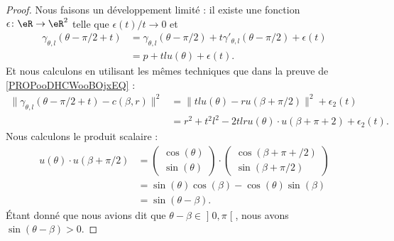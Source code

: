 \begin{proof}
	Nous faisons un développement limité : il existe une fonction \(\epsilon \colon \eR\to \eR^2  \) telle que \( \epsilon(t)/t\to 0\) et
	\begin{subequations}
		\begin{align}
			\gamma_{\theta,l}(\theta-\pi/2+t) & =\gamma_{\theta,l}(\theta-\pi/2)+t\gamma'_{\theta,l}(\theta-\pi/2)+\epsilon(t) \\
			                                  & =p+tlu(\theta)+\epsilon(t).
		\end{align}
	\end{subequations}
	Et nous calculons en utilisant les mêmes techniques que dans la preuve de \ref{PROPooDHCWooBOjxEQ} :
	\begin{subequations}
		\begin{align}
			\| \gamma_{\theta,l}(\theta-\pi/2+t)-c(\beta,r) \|^2 & =\| tlu(\theta)-ru(\beta+\pi/2) \|^2+\epsilon_2(t)                                        \\
			                                                     & =r^2+t^2l^2-2tlru(\theta)\cdot u(\beta+\pi+2)+\epsilon_2(t).		\label{SUBEQooTLBAooNNnYjV}
		\end{align}
	\end{subequations}
	Nous calculons le produit scalaire :
	\begin{subequations}
		\begin{align}
			u(\theta)\cdot u(\beta+\pi/2) & =\begin{pmatrix}
				                                 \cos(\theta) \\
				                                 \sin(\theta)
			                                 \end{pmatrix}\cdot
			\begin{pmatrix}
				\cos(\beta+\pi+/2) \\
				\sin(\beta+\pi/2)
			\end{pmatrix}                                                               \\
			                              & =\sin(\theta)\cos(\beta)-\cos(\theta)\sin(\beta) \\
			                              & =\sin(\theta-\beta).
		\end{align}
	\end{subequations}
	Étant donné que nous avions dit que \( \theta-\beta\in\mathopen] 0,\pi\mathclose[\), nous avons \( \sin(\theta-\beta)>0\).
\end{proof}


